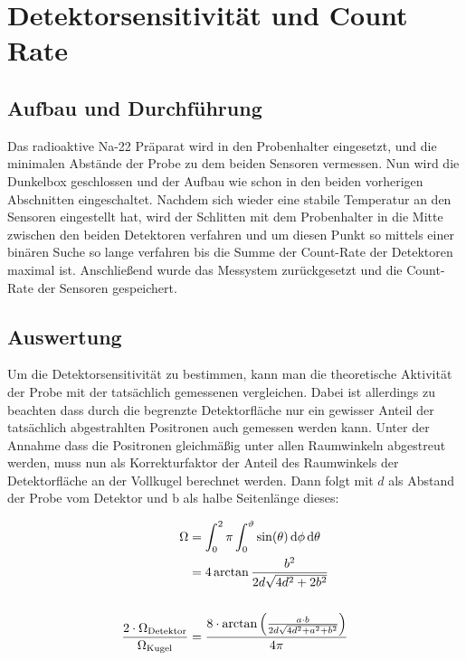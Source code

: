 \documentclass[12pt,twoside,a4paper]{scrartcl}
\begin{document}
	\section{Detektorsensitivität und Count Rate}

		\subsection{Aufbau und Durchführung}

			Das radioaktive Na-22 Präparat wird in den Probenhalter eingesetzt, und die minimalen Abstände der Probe zu dem beiden Sensoren vermessen. Nun wird die Dunkelbox geschlossen und der Aufbau wie schon in den beiden vorherigen Abschnitten eingeschaltet. Nachdem sich wieder eine stabile Temperatur an den Sensoren eingestellt hat, wird der Schlitten mit dem Probenhalter in die Mitte zwischen den beiden Detektoren verfahren und um diesen Punkt so mittels einer binären Suche so lange verfahren bis die Summe der Count-Rate der Detektoren maximal ist. Anschließend wurde das Messystem zurückgesetzt und die Count-Rate der Sensoren gespeichert.

		\subsection{Auswertung}

			Um die Detektorsensitivität zu bestimmen, kann man die theoretische Aktivität der Probe mit der tatsächlich gemessenen vergleichen.
			Dabei ist allerdings zu beachten dass durch die begrenzte Detektorfläche nur ein gewisser Anteil der tatsächlich abgestrahlten Positronen auch gemessen werden kann.
			Unter der Annahme dass die Positronen gleichmäßig unter allen Raumwinkeln abgestreut werden, muss nun als Korrekturfaktor der Anteil des Raumwinkels der Detektorfläche an der Vollkugel berechnet werden. Dann folgt mit $d$ als Abstand der Probe vom Detektor und b als halbe Seitenlänge dieses:

			\begin{align*}
				\Omega &= \int_0^2 \pi \int_0^\vartheta \sin(\theta) \dd{\phi} \dd{\theta}\\
							 &= 4 \arctan{ \frac{b^2}{2d \sqrt{4d^2 + 2b^2}}} \\
				\\
				\frac{2 \cdot \Omega_{\text{Detektor}}}{\Omega_{\text{Kugel}}} &=  \frac{8 \cdot \arctan{\qty(\frac{a\cdot b}{2d\sqrt{4d^2 + a^2 + b^2}})}}{4 \pi}
			\end{align*}
\end{document}
